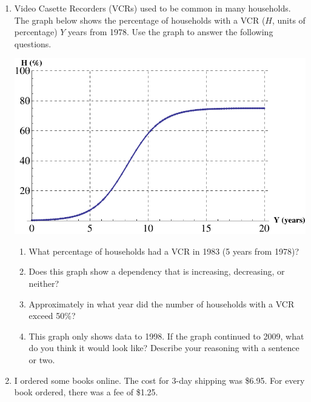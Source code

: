 \documentclass[12pt]{article}
\begin{document}
\hrulefill


\newpage
\begin{enumerate}
\item Video Casette Recorders (VCRs) used to be common in many households.  The graph below shows the percentage of households with a VCR ($H$, units of percentage) $Y$ years from 1978.  Use the graph to answer the following questions.

\begin{center}
 {\includegraphics [width = 8in] {vcr}}
\end{center}



\begin{enumerate}
\item What percentage of households had a VCR in 1983 (5 years from 1978)?
\vfill
\item Does this graph show a dependency that is increasing, decreasing, or neither?
\vfill
\item Approximately in what year did the number of households with a VCR exceed 50\%?
\vfill
\item This graph only shows data to 1998.  If the graph continued to 2009, what do you think it would look like?  Describe your reasoning with a sentence or two.
\vfill
\end{enumerate}

\newpage
\item  I ordered some books online.  The cost for 3-day shipping was \$6.95.  For every book ordered, there was a fee of \$1.25.   


\end{enumerate}
\end{document}
